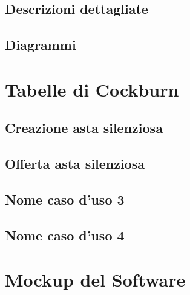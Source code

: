 \subsection{Descrizioni dettagliate}
\subsection{Diagrammi}

\section{Tabelle di Cockburn}
\subsection{Creazione asta silenziosa}
\subsection{Offerta asta silenziosa}
\subsection{Nome caso d'uso 3}
\subsection{Nome caso d'uso 4}

\section{Mockup del Software}